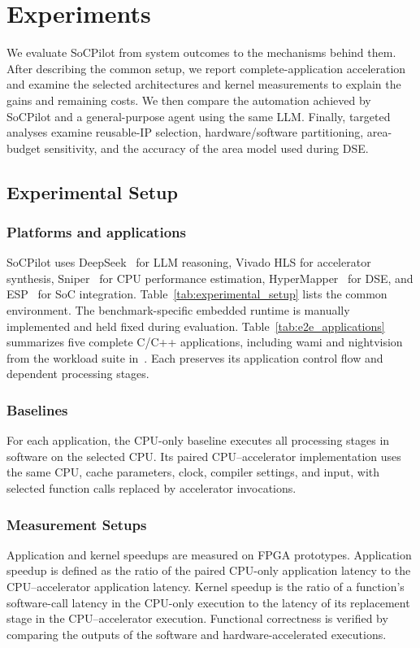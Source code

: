 
\section{Experiments}
\label{sec:evaluation}

We evaluate SoCPilot from system outcomes to the mechanisms behind them. After describing the common setup, we report complete-application acceleration and examine the selected architectures and kernel measurements to explain the gains and remaining costs. We then compare the automation achieved by SoCPilot and a general-purpose agent using the same LLM. Finally, targeted analyses examine reusable-IP selection, hardware/software partitioning, area-budget sensitivity, and the accuracy of the area model used during DSE.

\subsection{Experimental Setup}
\subsubsection{Platforms and applications}
SoCPilot uses DeepSeek~\cite{DeepSeek} for LLM reasoning, Vivado HLS for accelerator synthesis, Sniper~\cite{sniper} for CPU performance estimation, HyperMapper~\cite{nardi2019hypermapper} for DSE, and ESP~\cite{mantovani2020openesp} for SoC integration. Table~\ref{tab:experimental_setup} lists the common environment. The benchmark-specific embedded runtime is manually implemented and held fixed during evaluation.
\label{subsec:application_suite}
Table~\ref{tab:e2e_applications} summarizes five complete C/C++ applications, including wami and nightvision from the workload suite in~\cite{wami}. Each preserves its application control flow and dependent processing stages.


\subsubsection{Baselines}
For each application, the CPU-only baseline executes all processing stages in software on the selected CPU. Its paired CPU--accelerator implementation uses the same CPU, cache parameters, clock, compiler settings, and input, with selected function calls replaced by accelerator invocations.

\subsubsection{Measurement Setups}
Application and kernel speedups are measured on FPGA prototypes. Application speedup is defined as the ratio of the paired CPU-only application latency to the CPU--accelerator application latency. Kernel speedup is the ratio of a function's software-call latency in the CPU-only execution to the latency of its replacement stage in the CPU--accelerator execution. Functional correctness is verified by comparing the outputs of the software and hardware-accelerated executions.

